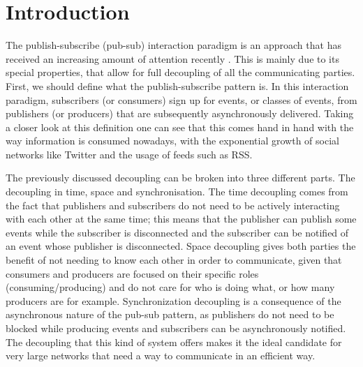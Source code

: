 
%
%

\section{Introduction}

The publish-subscribe (pub-sub) interaction paradigm is an approach that
has received an increasing amount of attention recently \cite{Kermarrec2013} \cite{Eugster2003}.
This is mainly due to its special properties, that allow for full decoupling of all the communicating
parties. First, we should define what the publish-subscribe pattern is.
In this interaction paradigm, subscribers (or consumers) sign up for
events, or classes of events, from publishers (or producers) that are
subsequently asynchronously delivered. Taking a closer look at this
definition one can see that this comes hand in hand with the way
information is consumed nowadays, with the exponential growth of social
networks like Twitter and the usage of feeds such as RSS.

The previously discussed decoupling can be broken into three different
parts. The decoupling in time, space and synchronisation. The time
decoupling comes from the fact that publishers and subscribers do not
need to be actively interacting with each other at the same time; this
means that the publisher can publish some events while the subscriber is
disconnected and the subscriber can be notified of an event whose
publisher is disconnected. Space decoupling gives both parties the
benefit of not needing to know each other in order to communicate, given
that consumers and producers are focused on their specific roles
(consuming/producing) and do not care for who is doing what, or how many
producers are for example. Synchronization decoupling is a consequence
of the asynchronous nature of the pub-sub pattern, as publishers do not
need to be blocked while producing events and subscribers can be
asynchronously notified. The decoupling that this kind of system offers
makes it the ideal candidate for very large networks that need a way to
communicate in an efficient way.

